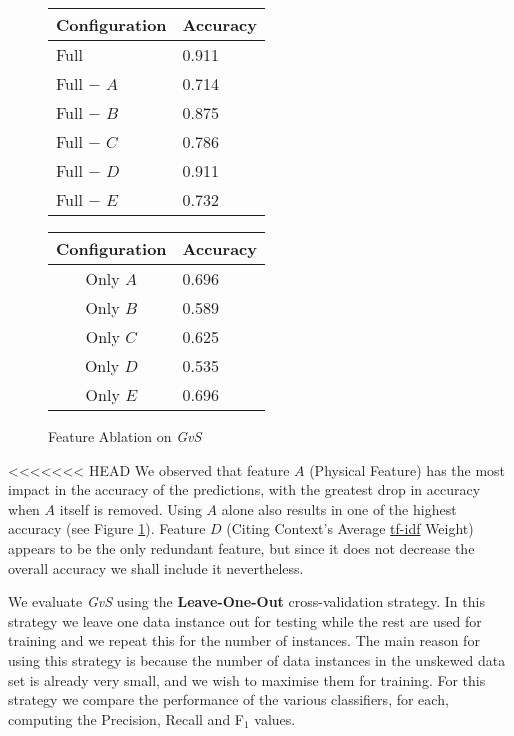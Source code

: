 \begin{figure}[ht]
\begin{minipage}[b]{0.45\linewidth}\centering
\begin{tabular}{ l | l }
Configuration & Accuracy \\
\hline
Full			& 0.911 \\
Full $-$ $A$	& 0.714 \\
Full $-$ $B$	& 0.875 \\
Full $-$ $C$	& 0.786 \\
Full $-$ $D$	& 0.911 \\
Full $-$ $E$	& 0.732 \\
\end{tabular}
\end{minipage}
\hspace{0.5cm}
\begin{minipage}[b]{0.45\linewidth}\centering
\begin{tabular}{ c | l }
Configuration & Accuracy \\
\hline
Only $A$	& 0.696 \\
Only $B$	& 0.589 \\
Only $C$	& 0.625 \\
Only $D$	& 0.535 \\
Only $E$	& 0.696 \\
\end{tabular}
\end{minipage}
\caption{Feature Ablation on {\it GvS}}
\label{fig:ablation_first}
\end{figure}

<<<<<<< HEAD
We observed that feature $A$ (Physical Feature) has the most impact in the accuracy of the predictions, with the greatest drop in accuracy when $A$ itself is removed.  Using $A$ alone also results in one of the highest accuracy (see Figure \ref{fig:ablation_first}). Feature $D$ (Citing Context's Average \url{tf-idf} Weight) appears to be the only redundant feature, but since it does not decrease the overall accuracy we shall include it nevertheless.

We evaluate \textit{GvS} using the \textbf{Leave-One-Out} cross-validation strategy. In this strategy we leave one data instance out for testing while the rest are used for training and we repeat this for the number of instances. The main reason for using this strategy is because the number of data instances in the unskewed data set is already very small, and we wish to maximise them for training. For this strategy we compare the performance of the various classifiers, for each, computing the Precision, Recall and F$_1$ values.

